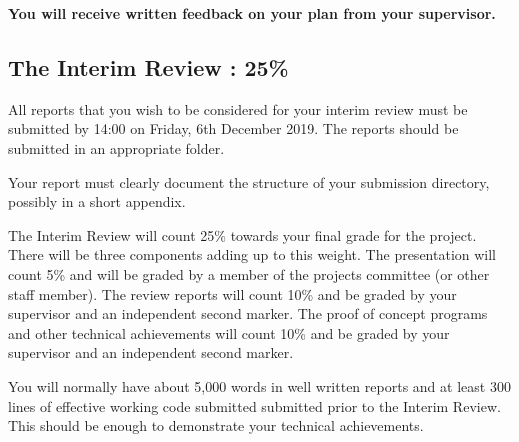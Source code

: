 \documentclass[11pt]{article}
\newcommand{\reviewSubmissiondate}{14:00 on Friday, 6th December 2019} %
\newcommand{\reviewweight}{25\% } %
\newcommand{\interimreportweight}{10\% }
\newcommand{\interimtechnicalweight}{10\% }
\newcommand{\vivaweight}{5\% }
\newcommand{\interimReportLength}{5,000 }
\begin{document}
\begin{tabular}{||l|c|p{10cm}|c||}
%
%
%
\end{tabular}
\vspace*{10mm}


\textbf{You will receive written feedback on your plan from your supervisor.}

\newpage
\subsection{The Interim Review : \reviewweight}
\label{sec:assess-review}
All reports that you wish to be considered for your interim review must be submitted by \reviewSubmissiondate. The reports should be submitted in an appropriate folder.

Your report must clearly document the structure of your submission directory,  possibly in a short appendix.

The Interim Review will count \reviewweight towards your final grade for the project.  There will be three components adding up to this weight.  The presentation will count \vivaweight and will be graded by  a member of the projects committee (or other staff member). The review reports will count \interimreportweight and be graded by your supervisor and an independent second marker. The proof of concept programs and other technical achievements will count \interimtechnicalweight and be graded by your supervisor and an independent second marker.

You will normally have about \interimReportLength words in well written reports and at least 300 lines of effective working code submitted submitted prior to the Interim Review.  This should be enough to demonstrate your technical achievements.
\end{document}
